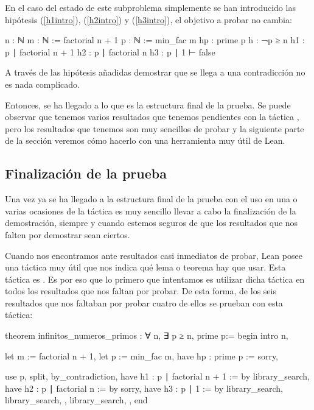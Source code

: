 En el caso del estado de este subproblema simplemente se han introducido las
hipótesis (\ref{h1intro}), (\ref{h2intro}) y (\ref{h3intro}), el objetivo a
probar no cambia:
\begin{leancode}
n : ℕ
m : ℕ := factorial n + 1
p : ℕ := min_fac m
hp : prime p
h : ¬p ≥ n
h1 : p ∣ factorial n + 1
h2 : p ∣ factorial n
h3 : p ∣ 1
⊢ false
\end{leancode}

A través de las hipótesis añadidas demostrar que se llega a una
contradicción no es nada complicado.

Entonces, se ha llegado a lo que es la estructura final de la prueba. Se
puede observar que tenemos varios resultados que tenemos pendientes con
la táctica , pero los resultados que tenemos son
muy sencillos de probar y la siguiente parte de la sección veremos cómo
hacerlo con una herramienta muy útil de Lean.

\subsection{Finalización de la prueba}

Una vez ya se ha llegado a la estructura final de la prueba con el uso
en una o varias ocasiones de la táctica  es muy
sencillo llevar a cabo la finalización de la demostración, siempre y
cuando estemos seguros de que los resultados que nos falten por
demostrar sean ciertos.

Cuando nos encontramos ante resultados casi inmediatos de probar, Lean
posee una táctica muy útil que nos indica qué lema o teorema hay que
usar. Esta táctica es . Es por
eso que lo primero que intentamos es utilizar dicha táctica en todos los
resultados que nos faltan por probar. De esta forma, de los seis
resultados que nos faltaban por probar cuatro de ellos se prueban con
esta táctica:
\begin{leancode}
theorem infinitos_numeros_primos : ∀ n, ∃ p ≥ n, prime p:=
begin
  intro n,

  let m := factorial n + 1,
  let p := min_fac m,
  have hp : prime p := sorry,

  use p,
  split,
  { by_contradiction,
    have h1 : p ∣ factorial n + 1 := by library_search,
    have h2 : p ∣ factorial n := by sorry,
    have h3 : p ∣ 1 := by library_search,
    library_search, },
  { library_search, },
end
\end{leancode}

